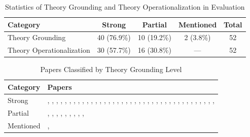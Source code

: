 
\begin{table}[tbp]
\centering
\begin{tabular}{lcccc}
\toprule
\textbf{Category} & \textbf{Strong} & \textbf{Partial} & \textbf{Mentioned} & \textbf{Total} \\
\midrule
Theory Grounding & 40 (76.9\%) & 10 (19.2\%) & 2 (3.8\%) & 52 \\
\midrule
Theory Operationalization & 30 (57.7\%) & 16 (30.8\%) & --- & 52 \\

\bottomrule
\end{tabular}
\caption{Statistics of Theory Grounding and Theory Operationalization in Evaluation}
\label{tab:theory-stats}
\end{table}

\begin{table}[tbp]
\centering
\small
\begin{tabular}{p{2.5cm}p{12.4cm}}
\toprule
\textbf{Category} & \textbf{Papers} \\
\midrule
Strong & \cite{Xiao2024HealMe}, \cite{Gabriel2024Can}, \cite{Haydarov2025Towards}, \cite{Qiu2025EmoAgent}, \cite{Aghakhani2025From}, \cite{Wang2025CARE-Bench}, \cite{Sungarda2025GenAI}, \cite{Chiu2024A}, \cite{Li2024Understanding}, \cite{Wang2024Towards}, \cite{Fouda2026PsychiatryBench}, \cite{Cai2026Exploring}, \cite{Nguyen2025Do}, \cite{Zhang2025CBT-BENCH}, \cite{Kim2025KMI}, \cite{Jaiswal2024Building}, \cite{Xu2025MentalChat16K}, \cite{Schmidmaier2025Using}, \cite{Schmidmaier2025UsingNonverbal}, \cite{Ozgun2025Trustworthy}, \cite{Louie2026Can}, \cite{Wang2024PATIENT}, \cite{Lee2024CACTUS}, \cite{Basar2024To}, \cite{Yang2025Consistent}, \cite{Yang2025CAMI}, \cite{Xie2025PsyDT}, \cite{Basar2025How}, \cite{Feng2025Reframe}, \cite{Xu2025MultiAgentESC}, \cite{Kim2025MIRROR}, \cite{Kim2025Can}, \cite{Liu2025Eeyore}, \cite{Wang2025Feel}, \cite{Samuel2025PersonaGym}, \cite{Chen2025MIND}, \cite{Na2024CBT-LLM}, \cite{Sharma2023Cognitive}, \cite{Wang2025Psychological}, \cite{Tanana2019Development} \\
\midrule
Partial & \cite{Wang2025AnnaAgent}, \cite{Liu2023ChatCounselor}, \cite{Hu2024PsycoLLM}, \cite{Qiu2026PsyCLIENT}, \cite{Deshpande2025Evaluating}, \cite{Louie2024Roleplay-doh}, \cite{Kermani2025Systematic}, \cite{Kang2024Can}, \cite{Chen2023LLM-empowered}, \cite{Schmidgall2025AgentClinic} \\
\midrule
Mentioned & \cite{Kuhail2025Human-Human}, \cite{Berrezueta-Guzman2024Future} \\
\bottomrule
\end{tabular}
\caption{Papers Classified by Theory Grounding Level}
\label{tab:theory-grounding}
\end{table}

